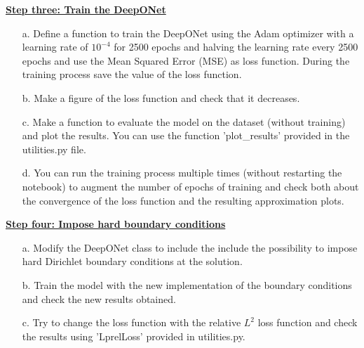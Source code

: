 \documentclass{article}
\newcommand{\step}[1]{\underline{\textbf{\large{#1}}} }
\begin{document}
  \newpage
  \restoregeometry
  \begin{center}\step{Step three: Train the DeepONet}\end{center}
    \begin{itemize}
      \item[a.] Define a function to train the DeepONet using the Adam optimizer with a learning rate of $10^{-4}$ for 2500 epochs and halving the learning rate every 2500 epochs and use the Mean Squared Error (MSE) as loss function. During the training process save the value of the loss function.
      \item[b.] Make a figure of the loss function and check that it decreases.
      \item[c.] Make a function to evaluate the model on the dataset (without training) and plot the results. You can use the function 'plot\_results' provided in the utilities.py file.
      \item[d.] You can run the training process multiple times (without restarting the notebook) to augment the number of epochs of training and check both about the convergence of the loss function and the resulting approximation plots.
    \end{itemize}

  \begin{center}\step{Step four: Impose hard boundary conditions}\end{center}
    \begin{itemize}
      \item[a.] Modify the DeepONet class to include the include the possibility to impose hard Dirichlet boundary conditions at the solution. 
      \item[b.] Train the model with the new implementation of the boundary conditions and check the new results obtained.
      \item[c.] Try to change the loss function with the relative $L^2$ loss function and check the results using 'LprelLoss' provided in utilities.py.
    \end{itemize}
\end{document}
